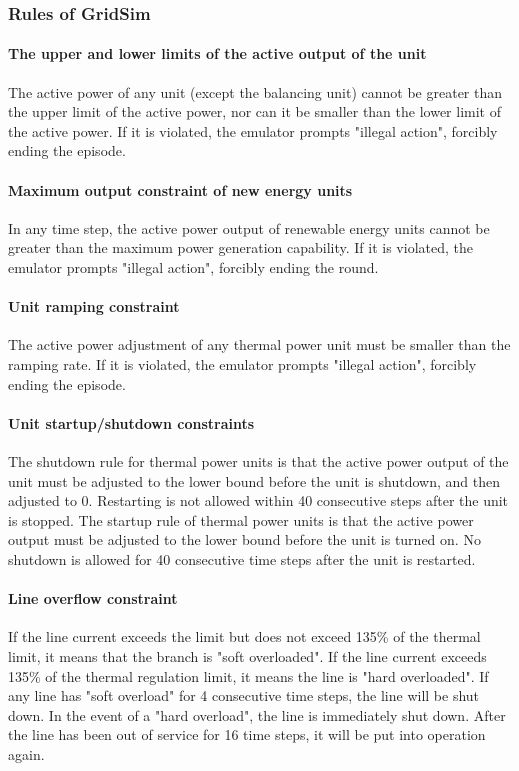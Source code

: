 \subsubsection*{Rules of GridSim}
\paragraph{The upper and lower limits of the active output of the unit} The active power of any unit (except the balancing unit) cannot be greater than the upper limit of the active power, nor can it be smaller than the lower limit of the active power. If it is violated, the emulator prompts "illegal action", forcibly ending the episode.

\paragraph{Maximum output constraint of new energy units} 
In any time step, the active power output of renewable energy units cannot be greater than the maximum power generation capability. If it is violated, the emulator prompts "illegal action", forcibly ending the round.

\paragraph{Unit ramping constraint} The active power adjustment of any thermal power unit must be smaller than the ramping rate. If it is violated, the emulator prompts "illegal action", forcibly ending the episode.

\paragraph{Unit startup/shutdown constraints} The shutdown rule for thermal power units is that the active power output of the unit must be adjusted to the lower bound before the unit is shutdown, and then adjusted to 0. Restarting is not allowed within 40 consecutive steps after the unit is stopped. The startup rule of thermal power units is that the active power output must be adjusted to the lower bound before the unit is turned on. No shutdown is allowed for 40 consecutive time steps after the unit is restarted.

\paragraph{Line overflow constraint} If the line current exceeds the limit but does not exceed 135\% of the thermal limit, it means that the branch is "soft overloaded". If the line current exceeds 135\% of the thermal regulation limit, it means the line is "hard overloaded". If any line has "soft overload" for 4 consecutive time steps, the line will be shut down. In the event of a "hard overload", the line is immediately shut down. After the line has been out of service for 16 time steps, it will be put into operation again.

